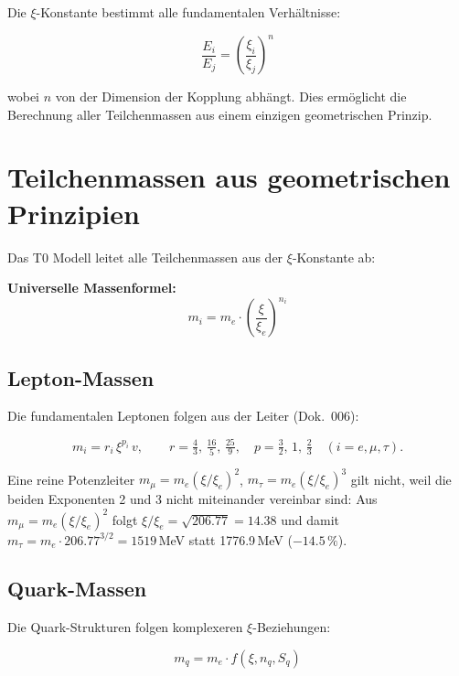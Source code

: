 Die $\xi$-Konstante bestimmt alle fundamentalen Verhältnisse:

\begin{equation}
	\frac{E_i}{E_j} = \left(\frac{\xi_i}{\xi_j}\right)^n
\end{equation}

wobei $n$ von der Dimension der Kopplung abhängt. Dies ermöglicht die Berechnung aller Teilchenmassen aus einem einzigen geometrischen Prinzip.

	
	\section{Teilchenmassen aus geometrischen Prinzipien}
	
	Das T0 Modell leitet alle Teilchenmassen aus der $\xi$-Konstante ab:
	
	\begin{formel}
		\textbf{Universelle Massenformel:}
		\begin{equation}
			m_i = m_e \cdot \left(\frac{\xi}{\xi_e}\right)^{n_i}
		\end{equation}
	\end{formel}
	
	\subsection{Lepton-Massen}
	
	Die fundamentalen Leptonen folgen aus der Leiter (Dok.~006):
	
	\begin{equation}
		m_i = r_i\,\xi^{p_i}\,v, \qquad r = \tfrac{4}{3},\,\tfrac{16}{5},\,\tfrac{25}{9}, \quad p = \tfrac{3}{2},\,1,\,\tfrac{2}{3} \quad (i = e,\mu,\tau).
	\end{equation}
	
	Eine reine Potenzleiter $m_\mu = m_e(\xi/\xi_e)^2$, $m_\tau = m_e(\xi/\xi_e)^3$ gilt nicht, weil die beiden Exponenten 2 und 3 nicht miteinander vereinbar sind: Aus $m_\mu=m_e(\xi/\xi_e)^2$ folgt $\xi/\xi_e=\sqrt{206.77}=14.38$ und damit $m_\tau=m_e\cdot 206.77^{3/2}=1519$\,MeV statt 1776.9\,MeV ($-14.5\,\%$).
	
	\subsection{Quark-Massen}
	
	Die Quark-Strukturen folgen komplexeren $\xi$-Beziehungen:
	
	\begin{equation}
		m_q = m_e \cdot f(\xi, n_q, S_q)
	\end{equation}
	
